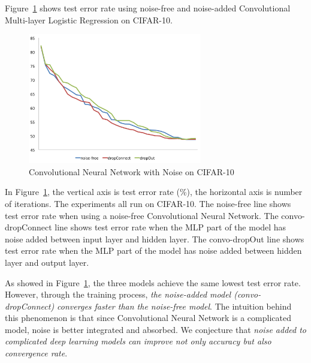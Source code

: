 Figure~\ref{convo10} shows test error rate using noise-free and noise-added
Convolutional Multi-layer Logistic Regression on CIFAR-10.
\begin{figure}[!htbp]
\centering
\includegraphics[width=215pt]{f-figs/convo10.png}
\caption{Convolutional Neural Network with Noise on CIFAR-10}
\label{convo10}
\end{figure}
In Figure~\ref{convo10}, the vertical axis is test error rate (\%), the
horizontal axis is number of iterations. The experiments all run on
CIFAR-10. The noise-free line shows test error rate when using a
noise-free Convolutional Neural Network.
The convo-dropConnect line shows test error rate when the MLP part of the
model has noise added between input layer and hidden layer.
The convo-dropOut line shows test error rate when the MLP part of the model
has noise added between hidden layer and output layer.

As showed in Figure~\ref{convo10}, the three models achieve the same lowest
test error rate. However, through the training process, {\em the
noise-added model (convo-dropConnect) converges faster than the noise-free
model}. The intuition behind this phenomenon is that since Convolutional
Neural Network is a complicated model, noise is better integrated and
absorbed. We conjecture that {\em noise added to complicated deep
learning models can improve not only accuracy but also convergence rate}.

